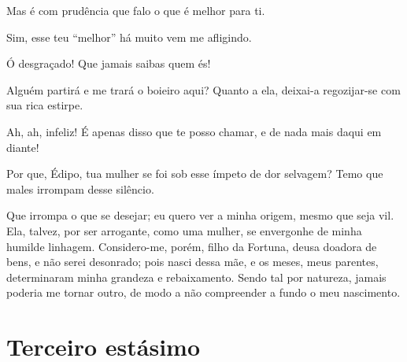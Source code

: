    Mas é com prudência que falo o que é melhor para ti.

   Sim, esse teu ``melhor'' há muito vem me afligindo.

   Ó desgraçado! Que jamais saibas quem és!

   Alguém partirá e me trará o boieiro aqui? Quanto a ela, deixai-a
regozijar-se com sua rica estirpe.

   Ah, ah, infeliz! É apenas disso que te posso chamar, e de nada mais
daqui em diante!


   Por que, Édipo, tua mulher se foi sob esse ímpeto de dor selvagem? Temo
que males irrompam desse silêncio.

   Que irrompa o que se desejar; eu quero ver a minha origem, mesmo que
seja vil. Ela, talvez, por ser arrogante, como uma mulher, se envergonhe
de minha humilde linhagem. Considero-me, porém, filho da Fortuna,
deusa doadora de bens, e não serei desonrado; pois nasci dessa mãe, e os
meses, meus parentes, determinaram minha grandeza e rebaixamento. Sendo
tal por natureza, jamais poderia me tornar outro, de modo a não
compreender a fundo o meu nascimento.


\section{Terceiro estásimo}




